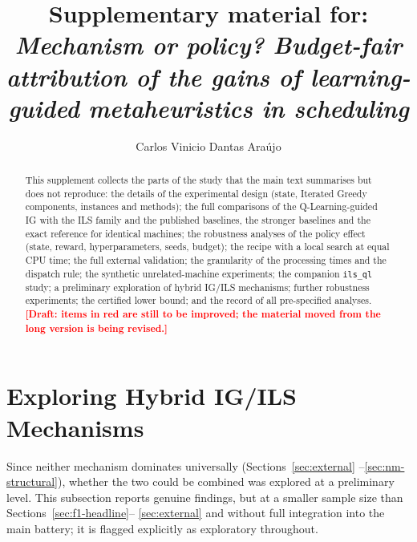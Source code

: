 \documentclass[final,3p,times,11pt,authoryear]{elsarticle}
\newif\ifdraftmarks \draftmarkstrue
\newcommand{\todonote}[1]{\ifdraftmarks\textcolor{red}{\textbf{[#1]}}\fi}
\begin{document}
\begin{frontmatter}
\title{Supplementary material for: \emph{Mechanism or policy? Budget-fair attribution of the gains of
       learning-guided metaheuristics in scheduling}}
\author{Carlos Vinicio Dantas Ara\'{u}jo}
\address{Graduate Program in Computer Science, State University of Cear\'{a} (UECE), Fortaleza, CE, Brazil}
\begin{abstract}
This supplement collects the parts of the study that the main text summarises but does not reproduce:
the details of the experimental design (state, Iterated Greedy components, instances and methods);
the full comparisons of the Q-Learning-guided IG with the ILS family and the published baselines, the
stronger baselines and the exact reference for identical machines; the robustness analyses of the
policy effect (state, reward, hyperparameters, seeds, budget); the recipe with a local search at equal CPU
time; the full external validation; the granularity of the processing times and the dispatch rule; the
synthetic unrelated-machine experiments; the companion \texttt{ils\_ql} study; a preliminary exploration of
hybrid IG/ILS mechanisms; further robustness experiments; the certified lower bound; and the record of all
pre-specified analyses. \todonote{Draft: items in red are still to be improved; the material moved from the long version is being revised.}
\end{abstract}
\end{frontmatter}



\section{Exploring Hybrid IG/ILS Mechanisms}
\label{sec:hybrid}

Since neither mechanism dominates universally (Sections~\ref{sec:external}%
--\ref{sec:nm-structural}), whether the two could be combined was
explored at a preliminary level. This subsection reports genuine findings,
but at a smaller sample size than Sections~\ref{sec:f1-headline}--%
\ref{sec:external} and without full integration into the main battery;
it is flagged explicitly as exploratory throughout.
\end{document}
